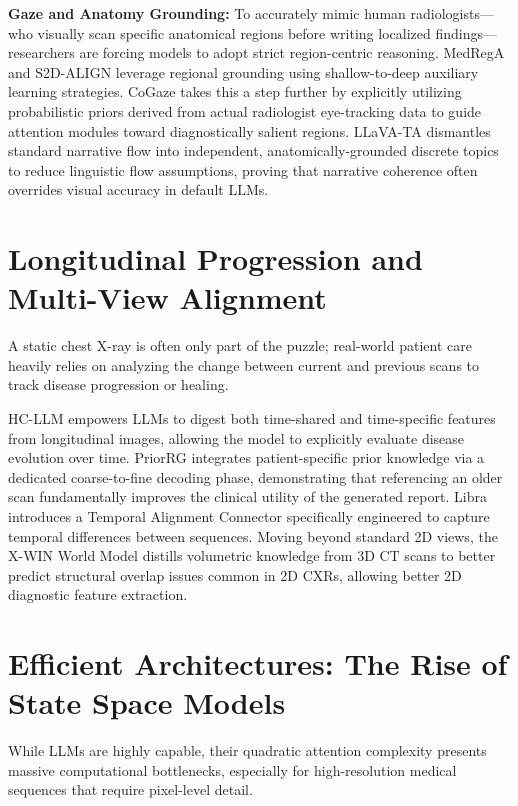 \documentclass[11pt]{article}
\begin{document}
\textbf{Gaze and Anatomy Grounding:}
To accurately mimic human radiologists---who visually scan specific anatomical regions before writing localized findings---researchers are forcing models to adopt strict region-centric reasoning. MedRegA \cite{medrega2025} and S2D-ALIGN \cite{s2dalign2026} leverage regional grounding using shallow-to-deep auxiliary learning strategies. CoGaze \cite{liu2026cogaze} takes this a step further by explicitly utilizing probabilistic priors derived from actual radiologist eye-tracking data to guide attention modules toward diagnostically salient regions. LLaVA-TA \cite{llavata2026} dismantles standard narrative flow into independent, anatomically-grounded discrete topics to reduce linguistic flow assumptions, proving that narrative coherence often overrides visual accuracy in default LLMs.

\section{Longitudinal Progression and Multi-View Alignment}

A static chest X-ray is often only part of the puzzle; real-world patient care heavily relies on analyzing the change between current and previous scans to track disease progression or healing.

HC-LLM \cite{hcllm2025} empowers LLMs to digest both time-shared and time-specific features from longitudinal images, allowing the model to explicitly evaluate disease evolution over time. PriorRG \cite{liu2026priorrg} integrates patient-specific prior knowledge via a dedicated coarse-to-fine decoding phase, demonstrating that referencing an older scan fundamentally improves the clinical utility of the generated report. Libra \cite{zhang2025libra} introduces a Temporal Alignment Connector specifically engineered to capture temporal differences between sequences. Moving beyond standard 2D views, the X-WIN World Model \cite{xwin2026} distills volumetric knowledge from 3D CT scans to better predict structural overlap issues common in 2D CXRs, allowing better 2D diagnostic feature extraction.

\section{Efficient Architectures: The Rise of State Space Models}

While LLMs are highly capable, their quadratic attention complexity presents massive computational bottlenecks, especially for high-resolution medical sequences that require pixel-level detail.
\end{document}
